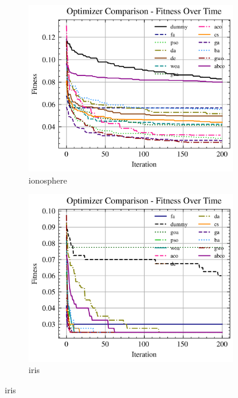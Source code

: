 \begin{figure}[htp]
    \begin{subfigure}[htp]{0.45\textwidth}
        \includegraphics[width=\textwidth]{imagenes/fitness_charts/img/binary/ionosphere/optimizers_fitness_svc.png}
        \caption{ionosphere}
    \end{subfigure}
    \begin{subfigure}[htp]{0.45\textwidth}
        \includegraphics[width=\textwidth]{imagenes/fitness_charts/img/binary/iris/optimizers_fitness_svc.png}
        \caption{iris}
    \end{subfigure}


\end{figure}
